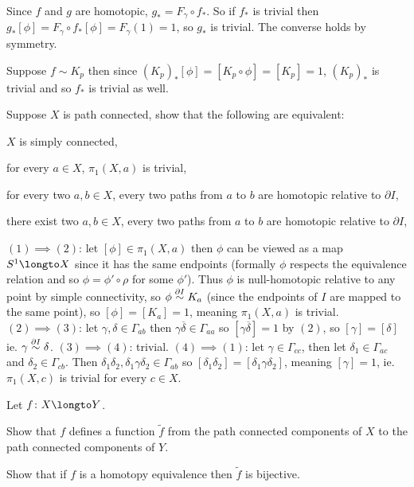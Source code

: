\eexerc

\benum
    \item Since $f$ and $g$ are homotopic, $g_*=F_\gamma\circ f_*$.
    So if $f_*$ is trivial then $g_*[\phi]=F_\gamma\circ f_*[\phi]=F_\gamma(1)=1$, so $g_*$ is trivial.
    The converse holds by symmetry.
    \item Suppose $f\sim K_p$ then since $(K_p)_*[\phi]=[K_p\circ\phi]=[K_p]=1$, $(K_p)_*$ is trivial and so $f_*$ is trivial as well.
\eenum

\bexerc

    Suppose $X$ is path connected, show that the following are equivalent:
    \benum
        \item $X$ is simply connected,
        \item for every $a\in X$, $\pi_1(X,a)$ is trivial,
        \item for every two $a,b\in X$, every two paths from $a$ to $b$ are homotopic relative to $\partial I$,
        \item there exist two $a,b\in X$, every two paths from $a$ to $b$ are homotopic relative to $\partial I$,
    \eenum

\eexerc

$(1)\implies(2)$: let $[\phi]\in\pi_1(X,a)$ then $\phi$ can be viewed as a map $S^1\longto X$ since it has the same endpoints (formally $\phi$ respects the equivalence relation and so $\phi=\phi'\circ\rho$
for some $\phi'$).
Thus $\phi$ is null-homotopic relative to any point by simple connectivity, so $\phi\hdi K_a$ (since the endpoints of $I$ are mapped to the same point), so $[\phi]=[K_a]=1$, meaning $\pi_1(X,a)$ is trivial.
$(2)\implies(3)$: let $\gamma,\delta\in\Gamma_{ab}$ then $\gamma\overline\delta\in\Gamma_{aa}$ so $[\gamma\overline\delta]=1$ by $(2)$, so $[\gamma]=[\delta]$ ie. $\gamma\hdi\delta$.
$(3)\implies(4)$: trivial.
$(4)\implies(1)$: let $\gamma\in\Gamma_{cc}$, then let $\delta_1\in\Gamma_{ac}$ and $\delta_2\in\Gamma_{cb}$.
Then $\delta_1\delta_2,\delta_1\gamma\delta_2\in\Gamma_{ab}$ so $[\delta_1\delta_2]=[\delta_1\gamma\delta_2]$, meaning $[\gamma]=1$, ie. $\pi_1(X,c)$ is trivial for every $c\in X$.

\bexerc

    Let $f\colon X\longto Y$.
    \benum
        \item Show that $f$ defines a function $\tilde f$ from the path connected components of $X$ to the path connected components of $Y$.
        \item Show that if $f$ is a homotopy equivalence then $\tilde f$ is bijective.
    \eenum

